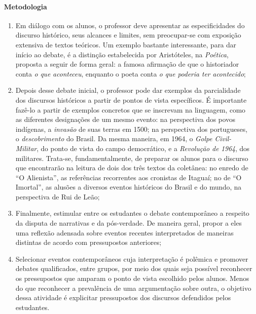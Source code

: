 \documentclass{extarticle}
\begin{document}
\paragraph{Metodologia}
\begin{enumerate}
\item Em diálogo com os alunos, o professor deve apresentar as
especificidades do discurso histórico, seus alcances e limites, sem
preocupar-se com exposição extensiva de textos teóricos. Um exemplo
bastante interessante, para dar início ao debate, é a distinção
estabelecida por Aristóteles, na \emph{Poética}, proposta a seguir de
forma geral: a famosa afirmação de que o historiador conta \emph{o que
aconteceu}, enquanto o poeta conta \emph{o que poderia ter acontecido};


\item Depois desse debate inicial, o professor pode dar exemplos da
parcialidade dos discursos históricos a partir de pontos de vista
específicos. É importante fazê-lo a partir de exemplos concretos que se
inscrevam na linguagem, como as diferentes designações de um mesmo
evento: na perspectiva dos povos indígenas, a \emph{invasão} de suas
terras em 1500; na perspectiva dos portugueses, o \emph{descobrimento}
do Brasil. Da mesma maneira, em 1964, o \emph{Golpe Civil-Militar}, do
ponto de vista do campo democrático, e a \emph{Revolução de 1964}, dos
militares. Trata-se, fundamentalmente, de preparar os alunos para o
discurso que encontrarão na leitura de dois dos três textos da
coletânea: no enredo de ``O Alienista'', as referências recorrentes aos
cronistas de Itaguaí; no de ``O Imortal'', as alusões a diversos eventos
históricos do Brasil e do mundo, na perspectiva de Rui de Leão;

\item Finalmente, estimular entre os estudantes o debate contemporâneo a
respeito da disputa de narrativas e da pós-verdade. De maneira geral,
propor a eles uma reflexão adensada sobre eventos recentes interpretados
de maneiras distintas de acordo com pressupostos anteriores;

\item Selecionar eventos contemporâneos cuja interpretação é polêmica e
promover debates qualificados, entre grupos, por meio dos quais seja
possível reconhecer os pressupostos que amparam o ponto de vista
escolhido pelos alunos. Menos do que reconhecer a prevalência de uma
argumentação sobre outra, o objetivo dessa atividade é explicitar
pressupostos dos discursos defendidos pelos estudantes.
\end{enumerate}
\end{document}
